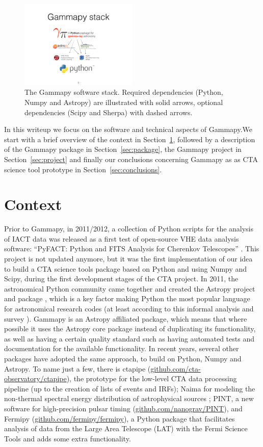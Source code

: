 \documentclass{PoS}
\newcommand{\urlCtaPipe}{\href{https://github.com/cta-observatory/ctapipe}{github.com/cta-observatory/ctapipe}}
\newcommand{\urlPint}{\href{https://github.com/nanograv/PINT}{github.com/nanograv/PINT}}
\newcommand{\urlFermipy}{\href{https://github.com/fermipy/fermipy}{github.com/fermipy/fermipy}}
\begin{document}
\begin{figure}[t]
\centering
\includegraphics[width=0.5\textwidth]{figures/gammapy-stack}
\caption{
The Gammapy software stack. Required dependencies (Python, Numpy and Astropy)
are illustrated with solid arrows, optional dependencies (Scipy and Sherpa) with
dashed arrows.
}
\label{fig:stack}
\end{figure}

In this writeup we focus on the software and technical aspects of Gammapy.We
start with a brief overview of the context in Section~\ref{sec:context},
followed by a description of the Gammapy package in Section~\ref{sec:package},
the Gammapy project in Section~\ref{sec:project} and finally our conclusions
concerning Gammapy as as CTA science tool prototype in
Section~\ref{sec:conclusions}.

\section{Context}
\label{sec:context}

Prior to Gammapy, in 2011/2012, a collection of Python scripts for the analysis
of IACT data was released as a first test of open-source VHE data analysis
software: ``PyFACT: Python and FITS Analysis for Cherenkov Telescopes''
\cite{pyfact}. This project is not updated anymore, but it was the first
implementation of our idea to build a CTA science tools package based on  Python
and using Numpy and Scipy, during the first development stages of the CTA
project. In 2011, the astronomical Python community came together and created
the Astropy project and package \cite{astropy}, which is a key factor making
Python the most popular language for astronomical research codes (at least
according to this informal analysis \cite{perry} and survey
\cite{momcheva2015}). Gammapy is an Astropy affiliated package, which means that
where possible it uses the Astropy core package instead of duplicating its
functionality, as well as having a certain quality standard such as having
automated tests and documentation for the available functionality. In recent
years, several other packages have adopted the same approach, to build on
Python, Numpy and Astropy. To name just a few, there is ctapipe (\urlCtaPipe),
the prototype for the low-level CTA data processing pipeline (up to the creation
of lists of events and IRFs); Naima for modeling the non-thermal spectral energy
distribution of astrophysical sources \cite{naima}; PINT, a new software for
high-precision pulsar timing (\urlPint), and Fermipy (\urlFermipy), a Python
package that facilitates analysis of data from the Large Area Telescope (LAT)
with the Fermi Science Tools and adds some extra functionality.
\end{document}
